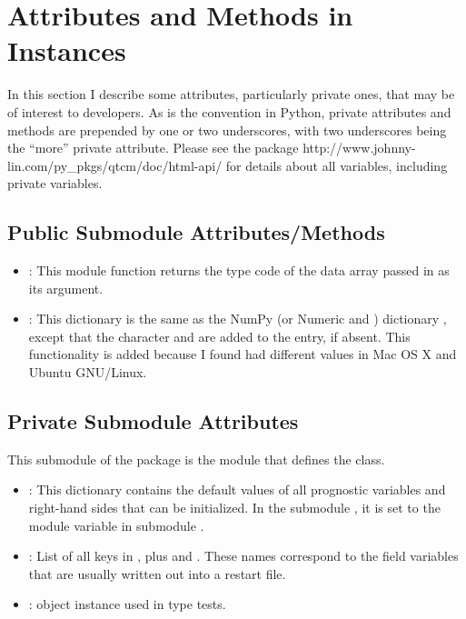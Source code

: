 \section{Attributes and Methods in  Instances}

In this section I describe some attributes, particularly private ones,
that may be of interest to developers.
As is the convention in Python, private
attributes and methods are prepended by one or two underscores,
with two underscores being the ``more'' private attribute.
Please see the package
        {%
		{http://www.johnny-lin.com/py\_pkgs/qtcm/doc/html-api/}}
for details about all variables, including private variables.


	\subsection{Public  Submodule Attributes/Methods}

\begin{itemize}
\item {}:  This module function returns the
	type code of the data array passed in as its argument.

\item {}:  This dictionary is the same as the
	NumPy (or Numeric and )
	dictionary , except that the character
	 and  are added to the
	 entry, if absent.  This
	functionality is added because I found 
	 had different values in
	Mac OS X and Ubuntu GNU/Linux.
\end{itemize}


	\subsection{Private  Submodule Attributes}

This submodule of the package  is the module that defines
the  class.

\begin{itemize}
\item {}:  This dictionary contains
	the default values of all prognostic variables and 
	right-hand sides that can be initialized.  In the
	submodule , it is set to
	the  module variable in
	submodule .

\item {}:  List of all keys in
	, plus 
	and .  These names correspond to the
	field variables that are usually written out into a
	restart file.

\item {}:   object instance used 
	in type tests.
\end{itemize}



